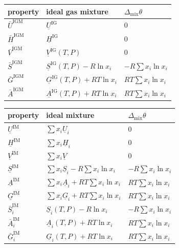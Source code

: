 \documentclass{article}
\begin{document}
\begin{center}
    \begin{tabular}{@{}lll@{}}
        \toprule
        property                                  & ideal gas mixture                           & $\Delta_{\text{mix}}\theta$ \\ \midrule
        $\bar{U}^{\text{IGM}}$                    & $\underline{U}^{\text{IG}}$                    & 0                           \\
        $\bar{H}^{\text{IGM}}$                    & $\underline{H}^{\text{IG}}$                    & 0                           \\
        $\bar{V}^{\text{IGM}}$ & $\underline{V}^{\text{IG}}(T,P)$               & 0                           \\
        $\bar{S}^{\text{IGM}}$ & $\underline{S}^{\text{IG}}(T,P) - R \ln x_{i}$  & $-R \sum x_{i} \ln x_{i}$   \\
        $\bar{G}^{\text{IGM}}$                    & $\underline{G}^{\text{IG}}(T,P) + RT \ln x_{i}$ & $RT \sum x_{i} \ln x_{i}$   \\ 
        $\bar{A}^{\text{IGM}}$                    & $\underline{A}^{\text{IG}}(T,P) + RT \ln x_{i}$ & $RT \sum x_{i} \ln x_{i}$   \\ 
        \bottomrule
    \end{tabular}
    \begin{tabular}{@{}lll@{}}
        \toprule
        property                                  & ideal mixture                           & $\Delta_{\text{mix}}\theta$ \\ \midrule
        $\underline{U}^{\text{IM}}$                    & $\sum x_i \underline{U}_i$                    & 0                           \\
        $\underline{H}^{\text{IM}}$                    & $\sum x_i \underline{H}_i$                    & 0                           \\
        $\underline{V}^{\text{IM}}$                           & $\sum x_i \underline{V}$               & 0                           \\
        $\underline{S}^{\text{IM}}$                     & $\sum x_i \underline{S}_i - R \sum x_i \ln x_{i}$  & $-R \sum x_{i} \ln x_{i}$   \\
        $\underline{A}^{\text{IM}}$                     & $\sum x_i \underline{A}_i + RT \sum x_i \ln x_{i}$  & $RT \sum x_{i} \ln x_{i}$   \\
        $\underline{G}^{\text{IM}}$                     & $\sum x_i \underline{G}_i + RT \sum x_i \ln x_{i}$  & $RT \sum x_{i} \ln x_{i}$   \\
        $\bar{S}^{\text{IM}}_i$                     & $\underline{S}_i(T,P) - R \ln x_{i}$  & $-R \sum x_{i} \ln x_{i}$   \\
        $\bar{A}^{\text{IM}}_i$                    & $\underline{A}_i(T,P) + RT \ln x_{i}$ & $RT \sum x_{i} \ln x_{i}$   \\ 
        $\bar{G}^{\text{IM}}_i$                    & $\underline{G}_i(T,P) + RT \ln x_{i}$ & $RT \sum x_{i} \ln x_{i}$   \\             
        \bottomrule
    \end{tabular}
\end{center}
\end{document}
